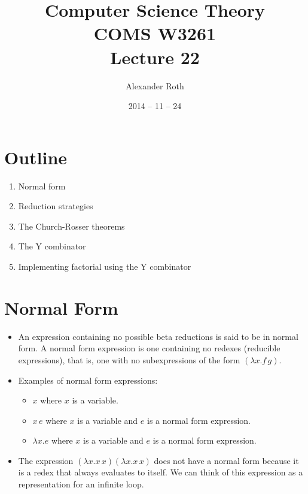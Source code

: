 \documentclass[]{article}
\begin{document}
\newtheorem{thm}{Theorem}
\title{Computer Science Theory \\ COMS W3261 \\ Lecture 22}
\author{Alexander Roth}
\date{2014 -- 11 -- 24}
\maketitle

\section*{Outline}
\begin{enumerate}
\item Normal form
\item Reduction strategies
\item The Church-Rosser theorems
\item The Y combinator
\item Implementing factorial using the Y combinator
\end{enumerate}

\section{Normal Form}
\begin{itemize}
\item An expression containing no possible beta reductions is said to be in
normal form. A normal form expression is one containing no redexes (reducible
expressions), that is, one with no subexpressions of the form $(\lambda
x.f\,g)$.
\item Examples of normal form expressions:
\begin{itemize}
\item $x$ where $x$ is a variable.
\item $x\,e$ where $x$ is a variable and $e$ is a normal form expression.
\item $\lambda x.e$ where $x$ is a variable and $e$ is a normal form expression.
\end{itemize}
\item The expression $(\lambda x.x\,x)(\lambda x.x\,x)$ does not have a normal
form because it is a redex that always evaluates to itself. We can think of this
expression as a representation for an infinite loop.
\end{itemize}
\end{document}
